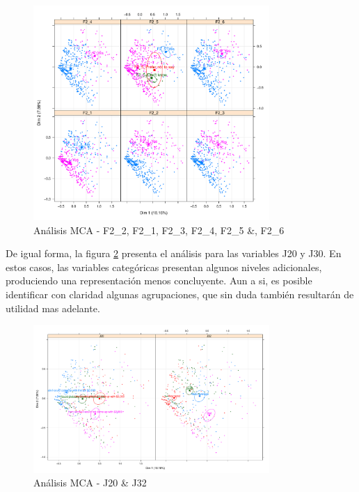 \documentclass[a4paper, 11pt]{article}
\begin{document}
\begin{figure}[ht]
    \centering
    \includegraphics[width=0.8\textwidth]{images/mca_stress_fX_Y_ellipses.pdf} 
    \caption{Análisis MCA - F2\_2, F2\_1, F2\_3, F2\_4, F2\_5 \&, F2\_6}
    \label{fig:mca_stress_fX_Y_ellipses}
\end{figure}

De igual forma, la figura \ref{fig:mca_stress_j20_j32_ellipses} presenta el análisis para las
variables J20 y J30. En estos casos, las variables categóricas presentan algunos niveles 
adicionales, produciendo una representación menos concluyente. Aun a si, es posible identificar 
con claridad algunas agrupaciones, que sin duda también resultarán de utilidad mas adelante.

\begin{figure}[ht]
    \centering
    \includegraphics[width=0.8\textwidth]{images/mca_stress_j20_j32_ellipses.pdf} 
    \caption{Análisis MCA - J20 \& J32}
    \label{fig:mca_stress_j20_j32_ellipses}
\end{figure}
\end{document}
